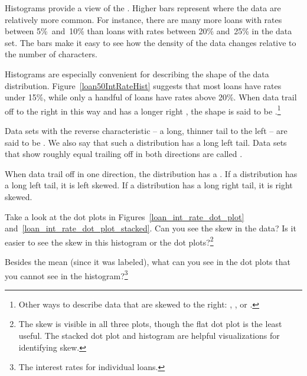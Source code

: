 Histograms provide a view of the .
Higher bars represent where the data are relatively more common.
For instance, there are many more loans with rates between
5\%~and~10\% than loans with rates between 20\% and~25\%
in the data set.
The bars make it easy to see how the density of the data
changes relative to the number of characters.

Histograms are especially convenient for describing the
shape of the data distribution\label{shapeFirstDiscussed}.
Figure~\ref{loan50IntRateHist} suggests that most loans
have rates under 15\%, while only a handful
of loans have rates above 20\%.
When data trail off to the right in this way
and has a longer right ,
the shape is said to be
.\footnote{Other
  ways to describe data that are skewed to the right:
  ,
  ,
  or .}

Data sets with the reverse characteristic --
a long, thinner tail to the left --
are said to be .
We also say that such a distribution has a long left tail.
Data sets that show roughly equal trailing off in both
directions are called .

\begin{termBox}{%
  When data trail off in one direction, the distribution
  has a . 
  If a distribution has a long left tail, it is left skewed.
  If a distribution has a long right tail, it is right skewed.}
\end{termBox}

\begin{exercise}
Take a look at the dot plots in
Figures~\ref{loan_int_rate_dot_plot}
and~\ref{loan_int_rate_dot_plot_stacked}.
Can you see the skew in the data? Is it easier to see the
skew in this histogram or the dot plots?\footnote{The skew
  is visible in all three plots, though the flat dot plot
  is the least useful.
  The stacked dot plot and histogram are helpful
  visualizations for identifying skew.}
\end{exercise}

\begin{exercise}
Besides the mean (since it was labeled), what can you see
in the dot plots that you cannot see in the
histogram?\footnote{The interest rates for individual loans.}
\end{exercise}

